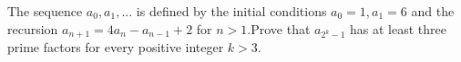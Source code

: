 The sequence $a_0,a_1,...$ is defined by the initial conditions $a_0=1,a_1=6$ and the recursion $a_{n+1}=4a_n-a_{n-1}+2$ for $n>1.$Prove that $a_{2^k-1}$ has at least three prime factors for every positive integer $k>3.$
